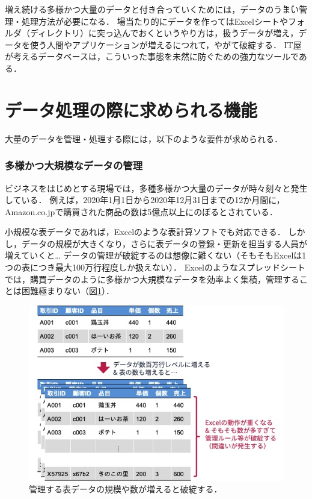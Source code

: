 増え続ける多様かつ大量のデータと付き合っていくためには，データの\.う\.ま\.い管理・処理方法が必要になる．
場当たり的にデータを作ってはExcelシートやフォルダ（ディレクトリ）に突っ込んでおくというやり方は，扱うデータが増え，データを使う人間やアプリケーションが増えるにつれて，やがて破綻する．
IT屋が考えるデータベースは，こういった事態を未然に防ぐための強力なツールである．


\section{データ処理の際に求められる機能}
大量のデータを管理・処理する際には，以下のような要件が求められる．

\subsubsection{多様かつ大規模なデータの管理}
ビジネスをはじめとする現場では，多種多様かつ大量のデータが時々刻々と発生している．
例えば，2020年1月1日から2020年12月31日までの12か月間に，Amazon.co.jpで購買された商品の数は5億点以上にのぼるとされている\cite{DataVolumeOfAmazon}．

小規模な表データであれば，Excelのような表計算ソフトでも対応できる．
しかし，データの規模が大きくなり，さらに表データの登録・更新を担当する人員が増えていくと…
データの管理が破綻するのは想像に難くない（そもそもExcelは1つの表につき最大100万行程度しか扱えない）．
Excelのようなスプレッドシートでは，購買データのように多様かつ大規模なデータを効率よく集積，管理することは困難極まりない（図\ref{fig:heavy-excel}）．

\begin{figure}[tb]
    \centering
    \includegraphics[width=1.0\textwidth]{figure/heavy-excel.jpg}
    \caption{管理する表データの規模や数が増えると破綻する．}
    \label{fig:heavy-excel}
\end{figure}


